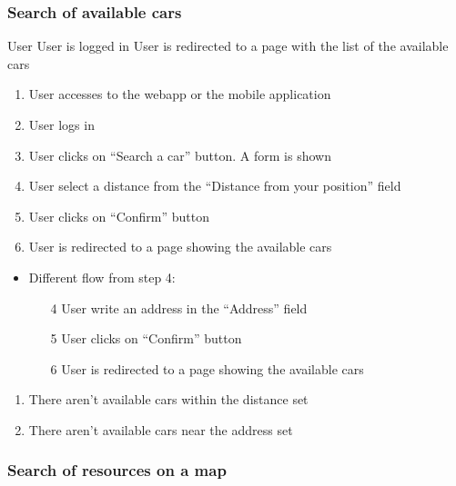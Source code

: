 \newpage
\subsubsection{Search of available cars}\label{search}

{User}
{}
{User is logged in}
{User is redirected to a page with the list of the available cars}
{
\begin{enumerate}
	\item User accesses to the webapp or the mobile application
	\item User logs in
	\item User clicks on ``Search a car'' button. A form is shown
	\item User select a distance from the ``Distance from your position'' field
	\item User clicks on ``Confirm'' button
	\item User is redirected to a page showing the available cars
\end{enumerate}
}
{
\begin{itemize}
\item Different flow from step 4:
	\begin{enumerate}
	\item[4] User write an address in the ``Address'' field 
	\item[5] User clicks on ``Confirm'' button
	\item[6] User is redirected to a page showing the available cars
 
\end{enumerate}

\end{itemize}


}
{
\begin{enumerate}
\item There aren't available cars within the distance set 
\item There aren't available cars near the address set
\end{enumerate}
}

\subsubsection{Search of resources on a map}\label{search2}

